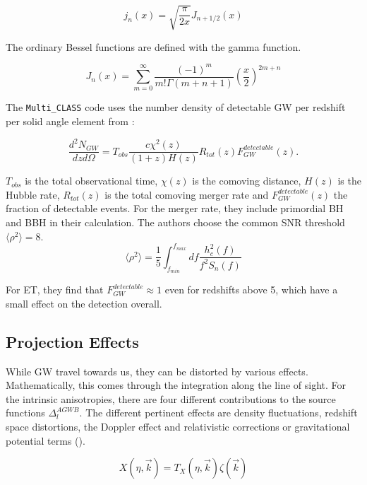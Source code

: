 \begin{equation}
    j_n(x)=\sqrt{\frac{\pi}{2x}}J_{n+1/2}(x)
\end{equation}

The ordinary Bessel functions are defined with the gamma function.

\begin{equation}
    J_n(x)=\sum_{m=0}^\infty \frac{(-1)^m}{m!\Gamma(m+n+1)}\left(\frac{x}{2}\right)^{2m+n}
\end{equation}

The {\tt Multi\_CLASS} code uses the number density of detectable GW per redshift per solid angle element from \cite{scelfo_gwtimeslss_2018}:

\begin{equation}
    \frac{d^2N_{GW}}{dzd\Omega} = T_{obs}\frac{c\chi^2(z)}{(1+z)H(z)}R_{tot}(z)F_{GW}^{detectable}(z).
\end{equation}

$T_{obs}$ is the total observational time, $\chi(z)$ is the comoving distance, $H(z)$ is the Hubble rate, $R_{tot}(z)$ is the total comoving merger rate and $F_{GW}^{detectable}(z)$ the fraction of detectable events. For the merger rate, they include primordial BH and BBH in their calculation.
The authors choose the common SNR threshold $\langle \rho^2 \rangle =8$.
\begin{equation}
    \langle \rho^2 \rangle = \frac{1}{5}\int_{f_{min}}^{f_{max}} df \frac{h_c^2(f)}{f^2 S_n(f)}
\end{equation}

For ET, they find that $F_{GW}^{detectable} \approx 1$ even for redshifts above 5, which have a small effect on the detection overall.

\subsection{Projection Effects}
\label{projection_effects}

While GW travel towards us, they can be distorted by various effects. Mathematically, this comes through the integration along the line of sight.
For the intrinsic anisotropies, there are four different contributions to the source functions $\Delta_l^{AGWB}$. The different pertinent effects are density fluctuations, redshift space distortions, the Doppler effect and relativistic corrections or gravitational potential terms (\cite{di_dio_classgal_2013}).


\begin{equation}
    X(\eta, \vec{k}) = T_X(\eta, \vec{k})\zeta(\vec{k})
\end{equation}

